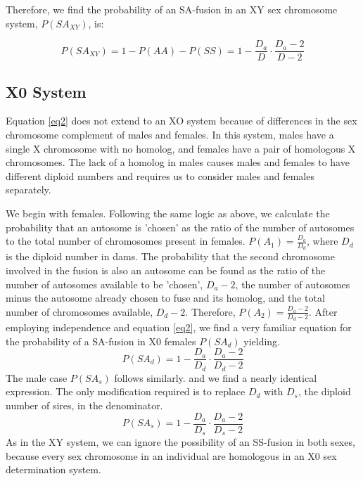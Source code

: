 \documentclass[12pt]{article}
\begin{document}
Therefore, we find the probability of an SA-fusion in an XY sex chromosome system, $P(SA_{XY})$, is:

\begin{equation} \label{eq2}
    P(SA_{XY}) = 1 - P(AA) - P(SS) = 1 - \frac{D_a}{D} \cdot \frac{D_a - 2}{D - 2}
\end{equation}

\subsection{X0 System}
Equation \ref{eq2} does not extend to an XO system because of differences in the sex chromosome complement of males and females. 
In this system, males have a single X chromosome with no homolog, and females have a pair of homologous X chromosomes. 
The lack of a homolog in males causes males and females to have different diploid numbers and requires us to consider males and females separately. 

We begin with females. Following the same logic as above, we calculate the probability that an autosome is 'chosen' as the ratio of the number of autosomes to the total number of chromosomes present in females. 
$P(A_1) = \frac{D_a}{D_d}$, where $D_d$ is the diploid number in dams. 
The probability that the second chromosome involved in the fusion is also an autosome can be found as the ratio of the number of autosomes available to be 'chosen', $D_a - 2$, the number of autosomes minus the autosome already chosen to fuse and its homolog, and the total number of chromosomes available, $D_d - 2$. 
Therefore, $P(A_2) = \frac{D_a - 2}{D_d - 2}$. 
After employing independence and equation \ref{eq2}, we find a very familiar equation for the probability of a SA-fusion in X0 females $P(SA_d)$ yielding. 
\begin{equation} \label{eq3}
    P(SA_d) =  1 - \frac{D_a}{D_d} \cdot \frac{D_a - 2}{D_d - 2}
\end{equation}
The male case $P(SA_s)$ follows similarly. and we find a nearly identical expression.
The only modification required is to replace $D_d$ with $D_s$, the diploid number of sires, in the denominator.
\begin{equation} \label{eq4}
    P(SA_s) = 1 - \frac{D_a}{D_s} \cdot \frac{D_a - 2}{D_s - 2}
\end{equation}
As in the XY system, we can ignore the possibility of an SS-fusion in both sexes, because every sex chromosome in an individual are homologous in an X0 sex determination system.
\end{document}
